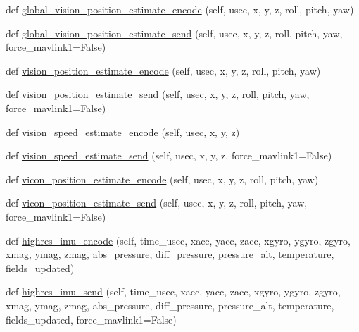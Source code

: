 \begin{DoxyCompactItemize}
\item 
def \hyperlink{classpymavlink_1_1dialects_1_1v10_1_1MAVLink_aa27de0d3a7a08f9b6411b506ccdbb7dd}{global\+\_\+vision\+\_\+position\+\_\+estimate\+\_\+encode} (self, usec, x, y, z, roll, pitch, yaw)
\item 
def \hyperlink{classpymavlink_1_1dialects_1_1v10_1_1MAVLink_a15271ee045cbb9a4bc12fec96e6a43bc}{global\+\_\+vision\+\_\+position\+\_\+estimate\+\_\+send} (self, usec, x, y, z, roll, pitch, yaw, force\+\_\+mavlink1=False)
\item 
def \hyperlink{classpymavlink_1_1dialects_1_1v10_1_1MAVLink_a4b199d999057acaec04ff881343a4b92}{vision\+\_\+position\+\_\+estimate\+\_\+encode} (self, usec, x, y, z, roll, pitch, yaw)
\item 
def \hyperlink{classpymavlink_1_1dialects_1_1v10_1_1MAVLink_a66bbaef268733d47c89bdfdaa7308e32}{vision\+\_\+position\+\_\+estimate\+\_\+send} (self, usec, x, y, z, roll, pitch, yaw, force\+\_\+mavlink1=False)
\item 
def \hyperlink{classpymavlink_1_1dialects_1_1v10_1_1MAVLink_a069128ac7552ff1cbbf67bae6586a025}{vision\+\_\+speed\+\_\+estimate\+\_\+encode} (self, usec, x, y, z)
\item 
def \hyperlink{classpymavlink_1_1dialects_1_1v10_1_1MAVLink_ae7c137f7207fcb390166f8a28024926c}{vision\+\_\+speed\+\_\+estimate\+\_\+send} (self, usec, x, y, z, force\+\_\+mavlink1=False)
\item 
def \hyperlink{classpymavlink_1_1dialects_1_1v10_1_1MAVLink_a67d3142f1810c8969c35386ce3c2f793}{vicon\+\_\+position\+\_\+estimate\+\_\+encode} (self, usec, x, y, z, roll, pitch, yaw)
\item 
def \hyperlink{classpymavlink_1_1dialects_1_1v10_1_1MAVLink_ad44cd1b83776b5de6b43142b632bb581}{vicon\+\_\+position\+\_\+estimate\+\_\+send} (self, usec, x, y, z, roll, pitch, yaw, force\+\_\+mavlink1=False)
\item 
def \hyperlink{classpymavlink_1_1dialects_1_1v10_1_1MAVLink_aeda010e9d611f3f52164dd883a7416e6}{highres\+\_\+imu\+\_\+encode} (self, time\+\_\+usec, xacc, yacc, zacc, xgyro, ygyro, zgyro, xmag, ymag, zmag, abs\+\_\+pressure, diff\+\_\+pressure, pressure\+\_\+alt, temperature, fields\+\_\+updated)
\item 
def \hyperlink{classpymavlink_1_1dialects_1_1v10_1_1MAVLink_ab326b32e6716cea70b25530d7b872683}{highres\+\_\+imu\+\_\+send} (self, time\+\_\+usec, xacc, yacc, zacc, xgyro, ygyro, zgyro, xmag, ymag, zmag, abs\+\_\+pressure, diff\+\_\+pressure, pressure\+\_\+alt, temperature, fields\+\_\+updated, force\+\_\+mavlink1=False)

\end{DoxyCompactItemize}
